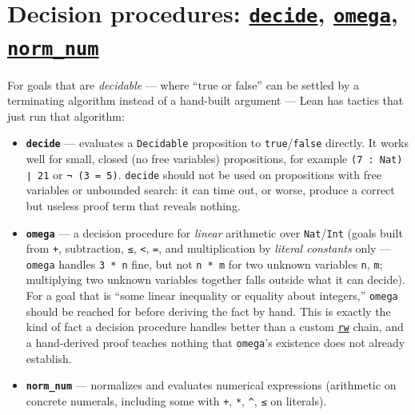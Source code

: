 \section{\texorpdfstring{Decision procedures: \href{https://lean-lang.org/doc/reference/latest/Tactic-Proofs/Tactic-Reference/}{\texttt{decide}}, \href{https://lean-lang.org/doc/reference/latest/Tactic-Proofs/Tactic-Reference/}{\texttt{omega}}, \href{https://lean-lang.org/doc/reference/latest/Tactic-Proofs/Tactic-Reference/}{\texttt{norm\_num}}}{Decision procedures: decide, omega, norm\_num}}\label{sec:12-working-efficiently:02-decision-procedures:1}

For goals that are \emph{decidable} --- where ``true or false'' can be settled by a terminating algorithm instead of a hand-built argument --- Lean has tactics that just run that algorithm:

\begin{itemize}
\tightlist
\item
  \textbf{\texttt{decide}} --- evaluates a \texttt{Decidable} proposition to \texttt{true}/\texttt{false} directly. It works well for small, closed (no free variables) propositions, for example \texttt{(7 : Nat) ∣ 21} or \texttt{¬ (3 = 5)}. \texttt{decide} should not be used on propositions with free variables or unbounded search: it can time out, or worse, produce a correct but useless proof term that reveals nothing.
\item
  \textbf{\texttt{omega}} --- a decision procedure for \emph{linear} arithmetic over \texttt{Nat}/\texttt{Int} (goals built from \texttt{+}, subtraction, \texttt{≤}, \texttt{<}, \texttt{=}, and multiplication by \emph{literal constants} only --- \texttt{omega} handles \texttt{3 * n} fine, but not \texttt{n * m} for two unknown variables \texttt{n}, \texttt{m}; multiplying two unknown variables together falls outside what it can decide). For a goal that is ``some linear inequality or equality about integers,'' \texttt{omega} should be reached for before deriving the fact by hand. This is exactly the kind of fact a decision procedure handles better than a custom \href{https://lean-lang.org/doc/reference/latest/Tactic-Proofs/Tactic-Reference/}{\texttt{rw}} chain, and a hand-derived proof teaches nothing that \texttt{omega}'s existence does not already establish.
\item
  \textbf{\texttt{norm\_\allowbreak{}num}} --- normalizes and evaluates numerical expressions (arithmetic on concrete numerals, including some with \texttt{+}, \texttt{*}, \texttt{\^}, \texttt{≤} on literals).
\end{itemize}

